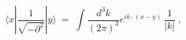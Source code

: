 \begin{equation}
\langle x|\frac{1}{\sqrt{-\partial^2}}|y\rangle\;=\; 
\int \frac{d^3k}{(2\pi)^3} e^{i k \cdot (x-y)} \, \frac{1}{|k|} \;,
\end{equation}

